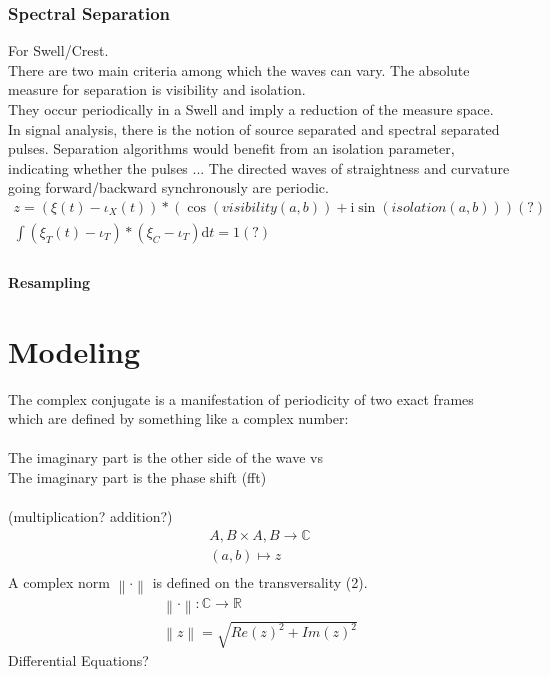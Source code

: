 \documentclass{report}
\newcommand\norm[1]{\left\lVert#1\right\rVert}
\begin{document}
\subsection{Spectral Separation}
For Swell/Crest.\\
There are two main criteria among which the waves can vary. The absolute measure for separation is visibility and isolation.\\
They occur periodically in a Swell and imply a reduction of the measure space.\\
In signal analysis, there is the notion of source separated and spectral separated pulses. Separation algorithms would benefit from an isolation parameter, indicating whether the pulses ...
The directed waves of straightness and curvature going forward/backward synchronously are periodic.
\begin{align}
z =  (\xi(t)-\iota_{X}(t))*(\cos{(visibility(a,b))} +\mathrm{i} \sin{(isolation(a,b))})(?)\\
\int \limits _{}^{} (\xi_{T}(t)-\iota_{T})*(\xi_{C}-\iota_{T})\mathrm{d}t=1(?)
\end{align}
\subsubsection{Resampling}

\chapter{Modeling}

The complex conjugate is a manifestation of periodicity of two exact frames which are defined by something like a complex number:\\\\
The imaginary part is the other side of the wave vs\\
The imaginary part is the phase shift (fft)\\\\
(multiplication? addition?)
\begin{align}
A,B \times A,B \rightarrow \mathbb{C}\\
(a,b) \mapsto z\\
\end{align}
A complex norm $\norm{\cdot}$ is defined on the transversality (2).
\begin{align}
\norm{\cdot} : \mathbb{C} \rightarrow \mathbb{R}\\
\norm{z} = \sqrt{Re(z)^2+Im(z)^2}
\end{align}
Differential Equations?
\end{document}
